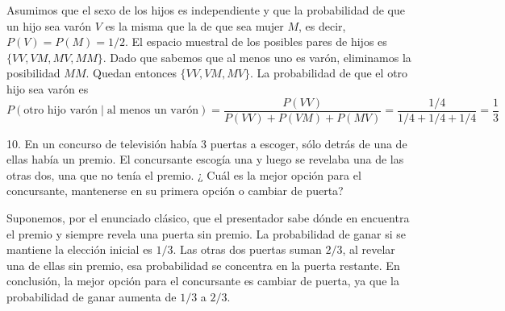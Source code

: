 \documentclass[11pt,a4paper]{article}
\begin{document}
Asumimos que el sexo de los hijos es independiente y que la probabilidad de que un hijo sea varón $V$ es la misma que la de que sea mujer $M$, es decir, $P(V) = P(M) = 1/2$. 
El espacio muestral de los posibles pares de hijos es $\{VV, VM, MV, MM\}$. Dado que sabemos que al menos uno es varón, eliminamos la posibilidad $MM$. Quedan entonces $\{VV, VM, MV\}$. La probabilidad de que el otro hijo sea varón es
\begin{equation*}
    P(\text{otro hijo varón} \mid \text{al menos un varón}) = \frac{P(VV)}{P(VV) + P(VM) + P(MV)} = \frac{1/4}{1/4 + 1/4 + 1/4} = \frac{1}{3}
\end{equation*}
\begin{tcolorbox}[colback=gray!20,colframe=gray!20, sharp corners]
10. En un concurso de televisión había 3 puertas a escoger, sólo detrás de una de ellas había un premio. El concursante escogía una y luego se revelaba una de las otras dos, una que no tenía el premio.
¿ Cuál es la mejor opción para el concursante, mantenerse en su primera opción o cambiar de puerta?
\end{tcolorbox}
Suponemos, por el enunciado clásico, que el presentador sabe dónde en encuentra el premio y siempre revela una puerta sin premio.
La probabilidad de ganar si se mantiene la elección inicial es $1/3$. Las otras dos puertas suman $2/3$, al revelar una de ellas sin premio, esa probabilidad se concentra en la puerta restante. \newline
En conclusión, la mejor opción para el concursante es cambiar de puerta, ya que la probabilidad de ganar aumenta de $1/3$ a $2/3$.
\end{document}
